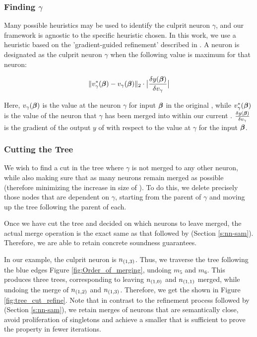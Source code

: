 \subsubsection{Finding $\gamma$}

Many possible heuristics may be used to identify the culprit neuron $\gamma$,
and our framework is agnostic to the specific heuristic chosen. In this work, we
use a heuristic based on the 'gradient-guided refinement' described in
\cite{lin-comb-abs-jan}. A neuron is designated as the culprit neuron $\gamma$
when the following value is maximum for that neuron: 

\begin{equation*}
\begin{aligned}
    \|v^{*}_{\gamma}(\boldsymbol{\beta}) - v_{\gamma}(\boldsymbol{\beta})\|_{2} \cdot 
    \big| \frac{\delta y(\boldsymbol{\beta})}{\delta v_{\gamma}} \big|
\end{aligned}
\end{equation*}

Here, $v_{\gamma}(\boldsymbol{\beta})$ is the value at the neuron $\gamma$ for input
$\boldsymbol{\beta}$ in the original \cnc, while $v^{*}_{\gamma}(\boldsymbol{\beta})$ is the
value of the neuron that $\gamma$ has been merged into within our current \abs.
$\frac{\delta y(\boldsymbol{\beta})}{\delta v_{\gamma}}$ is the gradient of the output
$y$ of \cnc with respect to the value at $\gamma$ for the input $\boldsymbol{\beta}$.

\subsubsection{Cutting the Tree}

We wish to find a cut in the tree where $\gamma$ is not merged to any other
neuron, while also making sure that as many neurons remain merged as possible
(therefore minimizing the increase in size of \abs). To do this, we delete
precisely those nodes that are dependent on $\gamma$, starting from the parent
of $\gamma$ and moving up the tree following the parent of each.

Once we have cut the tree and decided on which neurons to leave merged, the
actual merge operation is the exact same as that followed by \cite{cegar-nn}
(Section \ref{s:nn-sam}). Therefore, we are able to retain concrete soundness
guarantees.

In our example, the culprit neuron is $n_{(1,3)}$. Thus, we traverse the tree
following the blue edges Figure \ref{fig:Order_of_merging}, undoing $m_5$ and
$m_6$. This produces three trees, corresponding to leaving $n_{(1,0)}$ and
$n_{(1,1)}$ merged, while undoing the merge of $n_{(1,2)}$ and $n_{(1,3)}$.
Therefore, we get the \abs shown in Figure \ref{fig:tree_cut_refine}. Note
that in contrast to the refinement process followed by \cite{cegar-nn} (Section
\ref{s:nn-sam}), we retain merges of neurons that are semantically close, avoid
proliferation of singletons and achieve a smaller \abs that is sufficient to
prove the property in fewer iterations.

